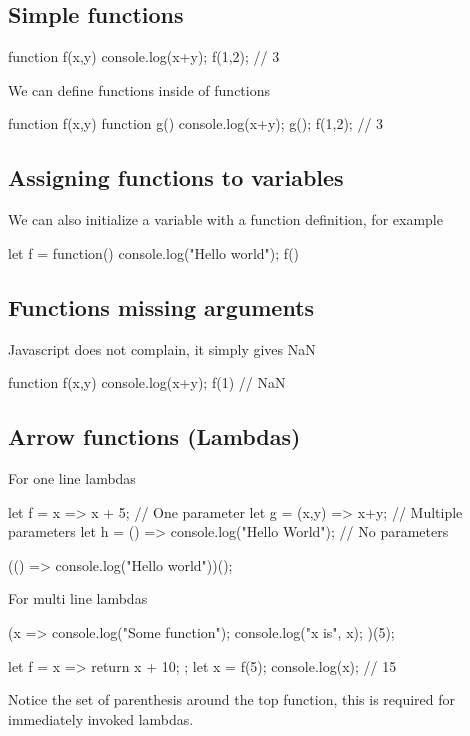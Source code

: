 \documentclass{report}
\begin{document}
    \pagebreak 
    \bigbreak \noindent 
    \subsection{Simple functions}
    \bigbreak \noindent 
    \begin{jscode}
        function f(x,y) {
            console.log(x+y);
        }
        f(1,2); // 3
    \end{jscode}
    \bigbreak \noindent 
    We can define functions inside of functions
    \bigbreak \noindent 
    \begin{jscode}
        function f(x,y) {
            function g() {
                console.log(x+y);
            }
            g();
        }
        f(1,2); // 3
    \end{jscode}

    \bigbreak \noindent 
    \subsection{Assigning functions to variables}
    \bigbreak \noindent 
    We can also initialize a variable with a function definition, for example
    \bigbreak \noindent 
    \begin{jscode}
        let f = function() {
            console.log("Hello world");
        }
        f()
    \end{jscode}

    \bigbreak \noindent 
    \subsection{Functions missing arguments}
    \bigbreak \noindent 
    Javascript does not complain, it simply gives NaN
    \bigbreak \noindent 
    \begin{cppcode}
        function f(x,y) {
            console.log(x+y);
        }
        f(1) // NaN
    \end{cppcode}

    \bigbreak \noindent 
    \subsection{Arrow functions (Lambdas)}
    \bigbreak \noindent 
    For one line lambdas
    \bigbreak \noindent 
    \begin{jscode}
        let f = x => x + 5; // One parameter
        let g = (x,y) => x+y; // Multiple parameters
        let h = () => console.log("Hello World"); // No parameters

        (() => console.log("Hello world"))();
    \end{jscode}
    \bigbreak \noindent 
    For multi line lambdas
    \bigbreak \noindent 
    \begin{jscode}
        (x => {
            console.log("Some function");
            console.log("x is", x);
        })(5);

        let f = x => {
            return x + 10;
        };
        let x = f(5);
        console.log(x); // 15
    \end{jscode}
    \bigbreak \noindent 
    Notice the set of parenthesis around the top function, this is required for immediately invoked lambdas.
\end{document}
